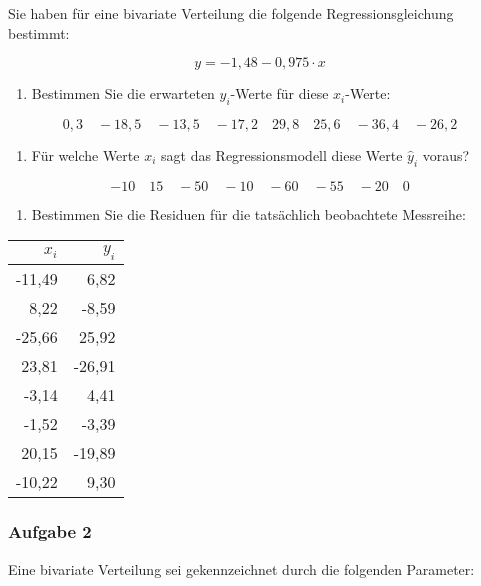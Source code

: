 \documentclass[
  ngerman,
]{article}
\providecommand{\tightlist}{%
  \setlength{\itemsep}{0pt}\setlength{\parskip}{0pt}}
\begin{document}
Sie haben für eine bivariate Verteilung die folgende Regressionsgleichung bestimmt:

\[
y=-1,48-0,975\cdot x
\]

\begin{enumerate}
\def\labelenumi{\alph{enumi})}
\tightlist
\item
  Bestimmen Sie die erwarteten \(\hat{y}_i\)-Werte für diese \(x_i\)-Werte:
\end{enumerate}

\[
0,3\quad-18,5\quad-13,5\quad-17,2\quad29,8\quad25,6\quad-36,4\quad-26,2
\]

\begin{enumerate}
\def\labelenumi{\alph{enumi})}
\setcounter{enumi}{1}
\tightlist
\item
  Für welche Werte \(x_i\) sagt das Regressionsmodell diese Werte \(\hat{y}_i\) voraus?
\end{enumerate}

\[
-10\quad15\quad-50\quad-10\quad-60\quad-55\quad-20\quad0
\]

\begin{enumerate}
\def\labelenumi{\alph{enumi})}
\setcounter{enumi}{2}
\tightlist
\item
  Bestimmen Sie die Residuen für die tatsächlich beobachtete Messreihe:
\end{enumerate}

\begin{table}
\centering
\begin{tabular}{rr}
\toprule
$x_i$ & $y_i$\\
\midrule
-11,49 & 6,82\\
8,22 & -8,59\\
-25,66 & 25,92\\
23,81 & -26,91\\
-3,14 & 4,41\\
-1,52 & -3,39\\
20,15 & -19,89\\
-10,22 & 9,30\\
\bottomrule
\end{tabular}
\end{table}

\hypertarget{aufgabe-2-7}{%
\subsubsection{Aufgabe 2}\label{aufgabe-2-7}}

Eine bivariate Verteilung sei gekennzeichnet durch die folgenden Parameter:
\end{document}
